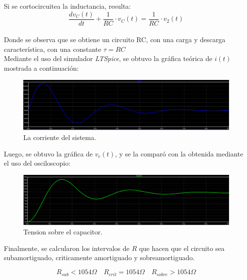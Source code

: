 \documentclass[a4paper]{article}
\begin{document}
Si se cortocircuitea la inductancia, resulta:
\begin{equation}
\frac{dv_{C}(t)}{dt}+\frac{1}{RC}\cdot v_{C}(t)=\frac{1}{RC}\cdot v_{2}(t)
\end{equation}\\
Donde se observa que se obtiene un circuito RC, con una carga y descarga característica, con una constante $\tau = RC$\\

Mediante el uso del simulador \textit{LTSpice}, se obtuvo la gráfica teórica de $i(t)$ mostrada a continuación:

\begin{figure}[H]
	\centering
	\includegraphics[scale=0.35]{carga-rlc-ic.PNG}
	\caption{La corriente del sistema.}
	\label{fig:-corrrlc}
\end{figure}

Luego, se obtuvo la gráfica de $v_c(t)$, y se la comparó con la obtenida mediante el uso del osciloscopio:
\flushleft
\begin{figure}[H]
	\includegraphics[scale=0.35]{carga-rlc-vc.PNG}
	\caption{Tension sobre el capacitor.}
	\label{fig:-tenrlc}
\end{figure}

Finalmente, se calcularon los intervalos de $R$ que hacen que el circuito sea subamortiguado, criticamente amortiguado y sobreamortiguado.

\[R_{sub}<1054 \Omega \quad R_{crit}= 1054 \Omega \quad R_{sobre}>1054 \Omega\]
\end{document}
